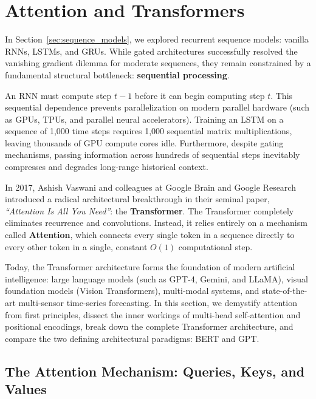 \section{Attention and Transformers}\label{sec:attention_transformers}

In Section~\ref{sec:sequence_models}, we explored recurrent sequence models: vanilla RNNs, LSTMs, and GRUs. While gated architectures successfully resolved the vanishing gradient dilemma for moderate sequences, they remain constrained by a fundamental structural bottleneck: \textbf{sequential processing}.

An RNN must compute step $t-1$ before it can begin computing step $t$. This sequential dependence prevents parallelization on modern parallel hardware (such as GPUs, TPUs, and parallel neural accelerators). Training an LSTM on a sequence of 1,000 time steps requires 1,000 sequential matrix multiplications, leaving thousands of GPU compute cores idle. Furthermore, despite gating mechanisms, passing information across hundreds of sequential steps inevitably compresses and degrades long-range historical context.

In 2017, Ashish Vaswani and colleagues at Google Brain and Google Research introduced a radical architectural breakthrough in their seminal paper, \emph{``Attention Is All You Need''}: the \textbf{Transformer}. The Transformer completely eliminates recurrence and convolutions. Instead, it relies entirely on a mechanism called \textbf{Attention}, which connects every single token in a sequence directly to every other token in a single, constant $O(1)$ computational step.

Today, the Transformer architecture forms the foundation of modern artificial intelligence: large language models (such as GPT-4, Gemini, and LLaMA), visual foundation models (Vision Transformers), multi-modal systems, and state-of-the-art multi-sensor time-series forecasting. In this section, we demystify attention from first principles, dissect the inner workings of multi-head self-attention and positional encodings, break down the complete Transformer architecture, and compare the two defining architectural paradigms: BERT and GPT.

\subsection{The Attention Mechanism: Queries, Keys, and Values}\label{subsec:attention_qkv}

